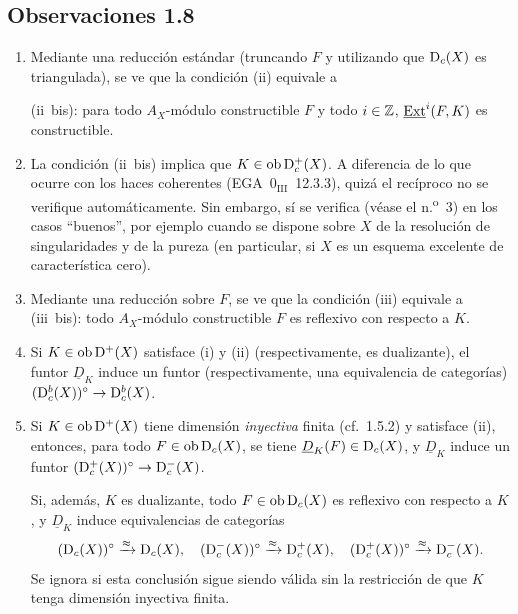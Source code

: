 \subsection*{Observaciones 1.8}
\begin{enumerate}[label=\alph*)]
\item Mediante una reducción estándar (truncando $F$ y utilizando que $\mathrm{D}_c(X)$ es triangulada), se ve que la condición (ii) equivale a

(ii~bis): para todo $A_X$-módulo constructible $F$ y todo $i \in \mathbb{Z}$, $\underline{\operatorname{Ext}}^i(F,K)$ es constructible.

\item La condición (ii~bis) implica que $K \in \operatorname{ob} \mathrm{D}_c^{+}(X)$. A diferencia de lo que ocurre con los haces coherentes (EGA~$0_{\mathrm{III}}$~12.3.3), quizá el recíproco no se verifique automáticamente. Sin embargo, sí se verifica (véase el n.\textsuperscript{o}~3) en los casos ``buenos'', por ejemplo cuando se dispone sobre $X$ de la resolución de singularidades y de la pureza (en particular, si $X$ es un esquema excelente de característica cero).

\item Mediante una reducción sobre $F$, se ve que la condición (iii) equivale a (iii~bis): todo $A_X$-módulo constructible $F$ es reflexivo con respecto a $K$.

\item Si $K \in \operatorname{ob} \mathrm{D}^{+}(X)$ satisface (i) y (ii) (respectivamente, es dualizante), el funtor $\underline{D}_K$ induce un funtor (respectivamente, una equivalencia de categorías) $(\mathrm{D}_c^{b}(X))^{\circ} \to \mathrm{D}_c^{b}(X)$.

\item Si $K \in \operatorname{ob} \mathrm{D}^{+}(X)$ tiene dimensión \emph{inyectiva} finita (cf.~1.5.2) y satisface (ii), entonces, para todo $F \in \operatorname{ob} \mathrm{D}_c(X)$, se tiene $\underline{D}_K(F) \in \mathrm{D}_c(X)$, y $\underline{D}_K$ induce un funtor $(\mathrm{D}_c^{+}(X))^{\circ} \to \mathrm{D}_c^{-}(X)$.

Si, además, $K$ es dualizante, todo $F \in \operatorname{ob} \mathrm{D}_c(X)$ es reflexivo con respecto a $K$, y $\underline{D}_K$ induce equivalencias de categorías
\[
(\mathrm{D}_c(X))^{\circ} \xrightarrow{\approx} \mathrm{D}_c(X), \quad (\mathrm{D}_c^{-}(X))^{\circ} \xrightarrow{\approx} \mathrm{D}_c^{+}(X), \quad (\mathrm{D}_c^{+}(X))^{\circ} \xrightarrow{\approx} \mathrm{D}_c^{-}(X).
\]
Se ignora si esta conclusión sigue siendo válida sin la restricción de que $K$ tenga dimensión inyectiva finita.
\end{enumerate}
